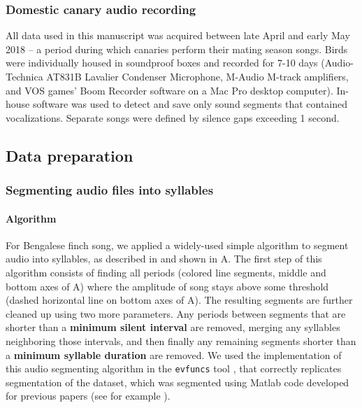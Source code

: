 \documentclass[9pt,lineno]{elife}
\begin{document}
\subsubsection{Domestic canary audio recording}
All data used in this manuscript was acquired between late April and early May 2018 – a period during which canaries perform their mating season songs. Birds were individually housed in soundproof boxes and recorded for 7-10 days (Audio-Technica AT831B Lavalier Condenser Microphone, M-Audio M-track amplifiers, and VOS games’ Boom Recorder software on a Mac Pro desktop computer). In-house software was used to detect and save only sound segments that contained vocalizations. Separate songs were defined by silence gaps exceeding 1 second.

\subsection{Data preparation}
\subsubsection{Segmenting audio files into syllables}
\label{methods:seg-audio}
\paragraph{Algorithm}
For  Bengalese finch song, we applied a widely-used simple algorithm 
to segment audio into syllables, 
as described in  and shown in A. 
The first step of this algorithm consists of finding all periods (colored line segments, 
middle and bottom axes of A) 
where the amplitude of song stays above some threshold 
(dashed horizontal line on bottom axes of A). 
The resulting segments are further cleaned up using two more parameters.  
Any periods between segments that are shorter than a \textbf{minimum silent interval} 
are removed, merging any syllables neighboring those intervals, 
and then finally any remaining segments shorter than a \textbf{minimum syllable duration} are removed.
We used the implementation of this audio segmenting algorithm 
in the \texttt{evfuncs} tool \citep{david_nicholson_2021_4584209},  
that correctly replicates segmentation of the \citep{nicholson_bengalese_2017} dataset,  
which was segmented using Matlab code developed for previous papers (see for example \citep{tumer_performance_2007}).
\end{document}
